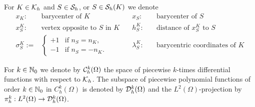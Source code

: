 For $K\in\mathcal K_h$ and $S\in\mathcal S_h$, or $S\in\mathcal S_h(K)$ we denote
%
\begin{align*}
x_K:\quad& \mbox{barycenter of $K$} \quad& x_S:\quad & \mbox{barycenter of $S$}\\
x_S^K:\quad & \mbox{vertex opposite to $S$ in $K$} \quad& h_S^K:\quad & \mbox{distance of $x_S^K$ to $S$}\\
\sigma_{S}^K :=&\begin{cases}
+1 & \mbox{if $n_S=n_K$},\\
-1 & \mbox{if $n_S=-n_K$}.
\end{cases}\quad&
\lambda_S^K:\quad& \mbox{barycentric coordinates of $K$} 
\end{align*}


For $k\in\mathbb N_0$ we denote by $\mathcal{C}_h^k(\Omega)$ the space of piecewise $k$-times differential functions with respect to $\mathcal K_h$. The subspace of piecewise polynomial functions of order $k\in\mathbb N_0$ in $C^k_h(\Omega)$ is denoted by $\mathcal{D}_h^k(\Omega)$ and the $L^2(\Omega)$-projection by $\pi_h^k:L^2(\Omega)\to\mathcal{D}_h^k(\Omega)$.

%
